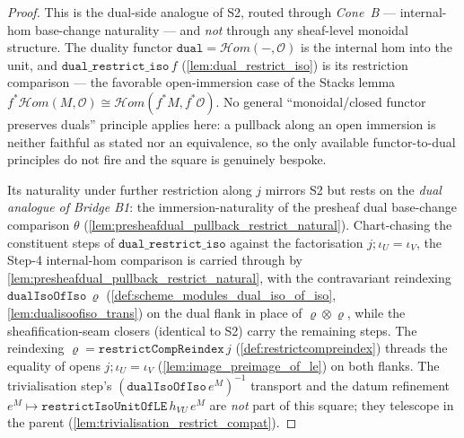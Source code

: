 \begin{proof}
  This is the dual-side analogue of S2, routed through \emph{Cone~B} --- internal-hom base-change
  naturality --- and \emph{not} through any sheaf-level monoidal structure. The duality functor
  \(\mathtt{dual} = \mathcal{H}om(-, \mathcal{O})\) is the internal hom into the unit, and
  \(\mathtt{dual\_restrict\_iso}\,f\) (\cref{lem:dual_restrict_iso}) is its restriction comparison ---
  the favorable open-immersion case of the Stacks lemma
  \(f^{*}\mathcal{H}om(M, \mathcal{O}) \cong \mathcal{H}om(f^{*}M, f^{*}\mathcal{O})\). No general
  ``monoidal/closed functor preserves duals'' principle applies here: a pullback along an open
  immersion is neither faithful as stated nor an equivalence, so the only available functor-to-dual
  principles do not fire and the square is genuinely bespoke.

  Its naturality under further restriction along \(j\) mirrors S2 but rests on the \emph{dual analogue
  of Bridge B1}: the immersion-naturality of the presheaf dual base-change comparison \(\theta\)
  (\cref{lem:presheafdual_pullback_restrict_natural}). Chart-chasing the constituent steps of
  \(\mathtt{dual\_restrict\_iso}\) against the factorisation \(j \mathbin{;} \iota_U = \iota_V\), the
  Step-4 internal-hom comparison is carried through by
  \cref{lem:presheafdual_pullback_restrict_natural}, with the contravariant reindexing
  \(\mathtt{dualIsoOfIso}\,\varrho\) (\cref{def:scheme_modules_dual_iso_of_iso},
  \cref{lem:dualisoofiso_trans}) on the dual flank in place of \(\varrho \otimes \varrho\), while the
  sheafification-seam closers (identical to S2) carry the remaining steps. The reindexing
  \(\varrho = \mathtt{restrictCompReindex}\,j\) (\cref{def:restrictcompreindex}) threads the equality
  of opens \(j \mathbin{;} \iota_U = \iota_V\) (\cref{lem:image_preimage_of_le}) on both flanks. The
  trivialisation step's \((\mathtt{dualIsoOfIso}\,e^M)^{-1}\) transport and the datum refinement
  \(e^M \mapsto \mathtt{restrictIsoUnitOfLE}\,h_{VU}\,e^M\) are \emph{not} part of this square; they
  telescope in the parent (\cref{lem:trivialisation_restrict_compat}).
\end{proof}

